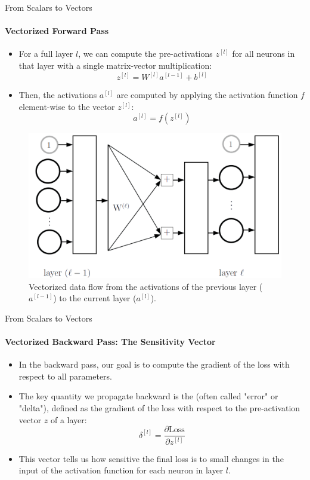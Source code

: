 \begin{frame}{From Scalars to Vectors}
    \framesubtitle{Vectorized Forward Pass}
    \begin{itemize}
        \item For a full layer $l$, we can compute the pre-activations $z^{[l]}$ for all neurons in that layer with a single matrix-vector multiplication:
        \[ z^{[l]} = W^{[l]}a^{[l-1]} + b^{[l]} \]
        \item Then, the activations $a^{[l]}$ are computed by applying the activation function $f$ element-wise to the vector $z^{[l]}$:
        \[ a^{[l]} = f(z^{[l]}) \]
    \end{itemize}
    \begin{figure}
        \centering
        \includegraphics[width=0.7\linewidth]{images/vectorized_backprop.png}
        \caption{Vectorized data flow from the activations of the previous layer ($a^{[l-1]}$) to the current layer ($a^{[l]}$).}
    \end{figure}
\end{frame}

\begin{frame}{From Scalars to Vectors}
    \framesubtitle{Vectorized Backward Pass: The Sensitivity Vector}
    \begin{itemize}
        \item In the backward pass, our goal is to compute the gradient of the loss with respect to all parameters.
        \item The key quantity we propagate backward is the  (often called "error" or "delta"), defined as the gradient of the loss with respect to the pre-activation vector $z$ of a layer:
        \[ \delta^{[l]} = \frac{\partial \text{Loss}}{\partial z^{[l]}} \]
        \item This vector tells us how sensitive the final loss is to small changes in the input of the activation function for each neuron in layer $l$.
    \end{itemize}
\end{frame}

